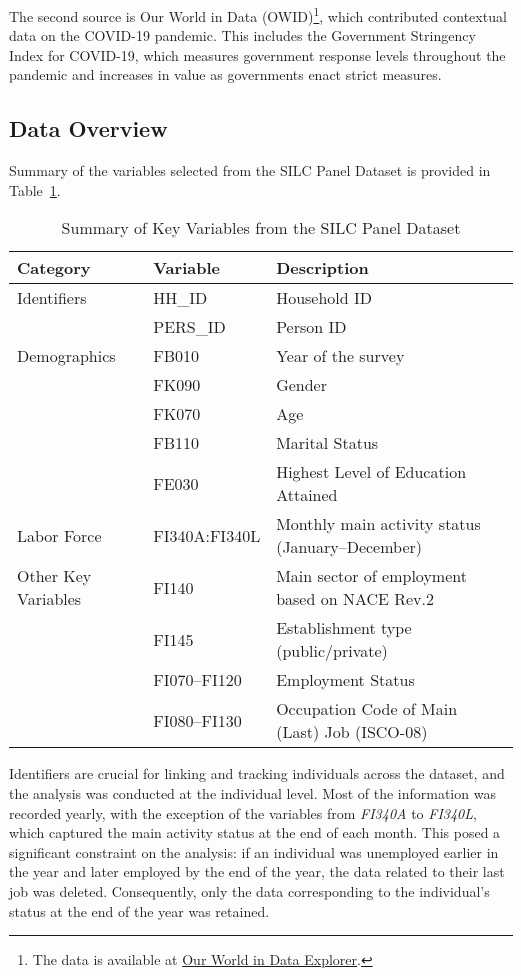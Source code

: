 \documentclass[a4paper,12pt]{article}
\begin{document}
The second source is Our World in Data (OWID)\footnote{The data is available at \href{https://ourworldindata.org/explorers/covid?country=~TUR&Metric=Stringency+index&Interval=Daily&Relative+to+population=false}{Our World in Data Explorer}.}, which contributed contextual data on the COVID-19 pandemic. This includes the Government Stringency Index for COVID-19, which measures government response levels throughout the pandemic and increases in value as governments enact strict measures.

\subsection{Data Overview}

\indent Summary of the variables selected from the SILC Panel Dataset is provided in Table~\ref{tab:key-vars}.

\begin{table}[h!]
\centering
\begin{tabular}{|l|l|p{8cm}|}
\hline
\textbf{Category} & \textbf{Variable} & \textbf{Description} \\ \hline
Identifiers & HH\_ID & Household ID \\ 
 & PERS\_ID & Person ID \\ \hline
Demographics & FB010 & Year of the survey \\ 
 & FK090 & Gender \\ 
 & FK070 & Age \\ 
 & FB110 & Marital Status \\ 
 & FE030 & Highest Level of Education Attained \\ \hline
Labor Force & FI340A:FI340L & Monthly main activity status (January--December) \\ \hline
Other Key Variables & FI140 & Main sector of employment based on NACE Rev.2 \\ 
 & FI145 & Establishment type (public/private) \\ 
 & FI070--FI120 & Employment Status \\ 
 & FI080--FI130 & Occupation Code of Main (Last) Job (ISCO-08) \\ \hline
\end{tabular}
\caption{Summary of Key Variables from the SILC Panel Dataset}
\label{tab:key-vars}
\end{table}

Identifiers are crucial for linking and tracking individuals across the dataset, and the analysis was conducted at the individual level. Most of the information was recorded yearly, with the exception of the variables from \textit{FI340A} to \textit{FI340L}, which captured the main activity status at the end of each month. This posed a significant constraint on the analysis: if an individual was unemployed earlier in the year and later employed by the end of the year, the data related to their last job was deleted. Consequently, only the data corresponding to the individual's status at the end of the year was retained. 
\end{document}
